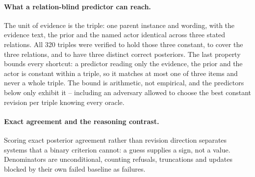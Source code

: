 \begin{center}
\begin{minipage}{\linewidth}
\centering
{}
\label{tab:exp1-fresh-mechanisms}
\small

\end{minipage}
\end{center}

\paragraph{What a relation-blind predictor can reach.}
The unit of evidence is the triple: one parent instance and wording, with the
evidence text, the prior and the named actor identical across three stated
relations. All 320 triples were verified to hold those
three constant, to cover the three relations, and to have three distinct correct
posteriors. The last property bounds every shortcut: a predictor reading only the
evidence, the prior and the actor is constant within a triple, so it matches at
most one of three items and never a whole triple. The bound is arithmetic, not
empirical, and the predictors below only exhibit it -- including an adversary
allowed to choose the best constant revision per triple knowing every oracle.

\begin{center}
\begin{minipage}{\linewidth}
\centering
{}
\label{tab:exp1-fresh-bound}
\small

\end{minipage}
\end{center}

\paragraph{Exact agreement and the reasoning contrast.}
Scoring exact posterior agreement rather than revision direction separates
systems that a binary criterion cannot: a guess supplies a sign, not a value.
Denominators are unconditional, counting refusals, truncations and updates
blocked by their own failed baseline as failures.

